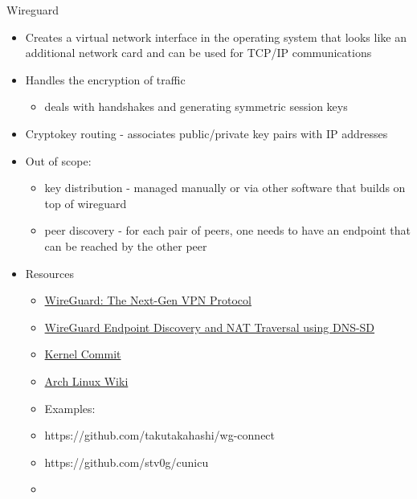 \begin{block}{Wireguard}
\begin{Shaded}
\begin{Highlighting}[]
\KeywordTok{[Peer]}
\OtherTok{=}
\OtherTok{=}
\OtherTok{=}
\OtherTok{=}\StringTok{ }
\end{Highlighting}
\end{Shaded}

\begin{itemize}
\tightlist
\item
  Creates a virtual network interface in the operating system that looks like an additional network card and can be used for TCP/IP communications
\item
  Handles the encryption of traffic

  \begin{itemize}
  \tightlist
  \item
    deals with handshakes and generating symmetric session keys
  \end{itemize}
\item
  Cryptokey routing - associates public/private key pairs with IP addresses
\item
  Out of scope:

  \begin{itemize}
  \tightlist
  \item
    key distribution - managed manually or via other software that builds on top of wireguard
  \item
    peer discovery - for each pair of peers, one needs to have an endpoint that can be reached by the other peer
  \end{itemize}
\item
  Resources

  \begin{itemize}
  \tightlist
  \item
    \href{https://blogs.keysight.com/blogs/tech/nwvs.entry.html/2022/09/22/wireguard_the_next-genvpnprotocol-OcEz.html}{WireGuard: The Next-Gen VPN Protocol}
  \item
    \href{https://www.jordanwhited.com/posts/wireguard-endpoint-discovery-nat-traversal/}{WireGuard Endpoint Discovery and NAT Traversal using DNS-SD}
  \item
    \href{https://git.kernel.org/pub/scm/linux/kernel/git/torvalds/linux.git/commit/?id=e7096c131e5161fa3b8e52a650d7719d2857adfd}{Kernel Commit}
  \item
    \href{https://wiki.archlinux.org/title/WireGuard}{Arch Linux Wiki}
  \item
    Examples:
  \item
    https://github.com/takutakahashi/wg-connect
  \item
    https://github.com/stv0g/cunicu
  \item
  \end{itemize}
\end{itemize}
\end{block}

